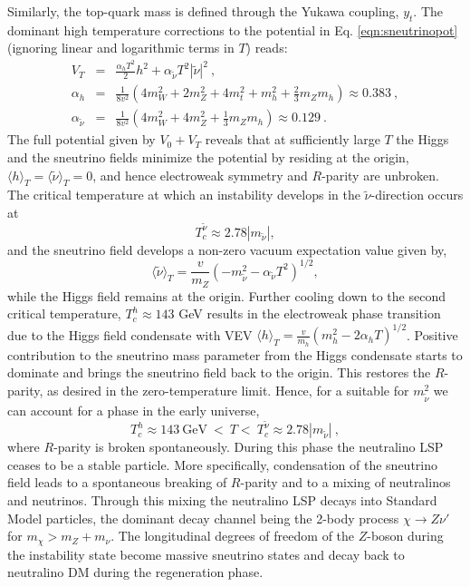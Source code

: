 Similarly, the top-quark mass is defined through the Yukawa coupling, $y_t$. The dominant high temperature corrections to the potential in Eq. \ref{eqn:sneutrinopot} (ignoring linear and logarithmic terms in $T$) reads:
\begin{eqnarray}
V_T&=& \frac{\alpha_hT^2}{2}h^2+\alpha_{\tilde \nu}T^2|\tilde \nu|^2~, \\
\label{eqn:ah}
\alpha_h &=&\frac{1}{8v^2}\left(4m_W^2+2m_Z^2+4m_t^2+m_h^2+\frac{2}{3}m_Zm_h\right)\approx 0.383~, \\
\label{eqn:anu}
\alpha_{\tilde \nu} &=&\frac{1}{8v^2}\left(4m_W^2+4m_Z^2+\frac{1}{3}m_Zm_h\right)\approx 0.129~. 
\end{eqnarray}
The full potential given by $V_0+V_T$ reveals that at sufficiently large $T$ the Higgs and the sneutrino fields minimize the potential by residing at the origin, $\langle h \rangle_T=\langle \tilde \nu\rangle_T=0$, and hence electroweak symmetry and $R$-parity are unbroken. The critical temperature at which an instability develops in the $\tilde \nu$-direction occurs at
\begin{equation}
T_c^{\tilde \nu}\approx 2.78|m_{\tilde \nu}|,
\end{equation}
and the sneutrino field develops a non-zero vacuum expectation value given by, 
\begin{equation}
\langle \tilde \nu\rangle_T=\frac{v}{m_Z}\left(-m_{\tilde \nu}^2-\alpha_{\tilde \nu}T^2\right)^{1/2},
\end{equation}
while the Higgs field remains at the origin. Further cooling down to the second critical temperature, $T_c^{h}\approx 143$ GeV results in the electroweak phase transition due to the Higgs field condensate with VEV $\langle h \rangle_T=\frac{v}{m_h}\left(m_h^2-2\alpha_h T\right)^{1/2}$. Positive contribution to the sneutrino mass parameter from the Higgs condensate starts to dominate and brings the sneutrino field back to the origin. This restores the $R$-parity, as desired in the zero-temperature limit. Hence, for a suitable for $m_{\tilde \nu}^2$ we can account for a phase in the early universe,
\begin{equation}
T_c^h \approx 143~\text{GeV}~ < ~ T  <~ T_{c}^{\tilde \nu}\approx 2.78 |m_{\tilde\nu}|~,
\end{equation} 
where $R$-parity is broken spontaneously. 
\noindent
During this phase the neutralino LSP ceases to be a stable particle. More specifically, condensation of the sneutrino field leads to a spontaneous breaking of $R$-parity and to a mixing of neutralinos and neutrinos. Through this mixing the neutralino LSP decays into Standard Model particles, the dominant decay channel being the 2-body process $\chi\to Z\nu'$ for $m_{\chi}>m_Z+m_{\nu}$. The longitudinal degrees of freedom of the $Z$-boson during the instability state become massive sneutrino states and decay back to neutralino DM during the regeneration phase. 

